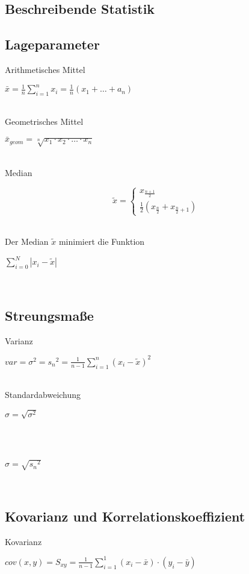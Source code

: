 \documentclass[10pt,a4paper,landscape]{article}
\begin{document}
\begin{multicols*}{4}
\section{Beschreibende Statistik}
\subsection{Lageparameter}
Arithmetisches Mittel \\
\parbox{\columnwidth}{\centering$\bar{x}=\frac{1}{n}\sum \limits_{i=1}^n x_i=\frac{1}{n}(x_1 + \dots + a_n)$}\\

Geometrisches Mittel \\
\parbox{\columnwidth}{\centering$\bar{x}_{geom} = \sqrt[n]{x_1 \cdot x_2 \cdot \dots \cdot x_n}$}\\

Median \\
\parbox{\columnwidth}{\centering\[\tilde{x}=\begin{cases}x_{\frac{n+1}{2}}\\\frac{1}{2}(x_{\frac{n}{2}}+x_{\frac{n}{2}+1})\end{cases}\]}\\

Der Median $\tilde{x}$ minimiert die Funktion \\
\parbox{\columnwidth}{\centering$\sum \limits_{i=0}^N|x_i-\tilde{x}|$}\\

\subsection{Streungsmaße}
Varianz \\
\parbox{\columnwidth}{\centering$var = \sigma^2 = {s_n}^2 = \frac{1}{n-1} \sum \limits_{i=1}^n(x_i-\tilde{x})^2$}\\

Standardabweichung \\
\parbox{\columnwidth}{\centering$\sigma = \sqrt{\sigma^2}$}\\
\\
\parbox{\columnwidth}{\centering$\sigma = \sqrt{{s_n}^2}$}\\


\subsection{Kovarianz und Korrelationskoeffizient}
Kovarianz \\
\parbox{\columnwidth}{\centering$cov(x,y) = S_{xy} = \frac{1}{n-1}\sum \limits_{i=1}^1(x_i-\bar{x})\cdot(y_i-\bar{y})$}\\


\end{multicols*}
\end{document}
